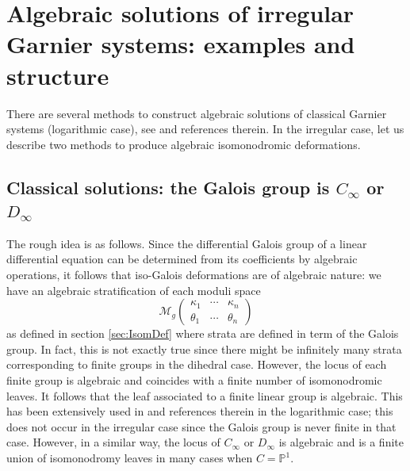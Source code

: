 \documentclass[12]{amsart}
\begin{document}
\section{Algebraic solutions of irregular Garnier systems: examples and structure}\label{sec:algsol}

There are several methods to construct algebraic solutions of classical Garnier systems (logarithmic case),
see \cite{AK,Boalch,CM,Diarra1,Doran,DM0,LisovyyTykhyy} and references therein.
In the irregular case, let us describe two methods to produce algebraic isomonodromic deformations.




\subsection{Classical solutions: the Galois group is $C_\infty$ or $D_\infty$}\label{sec:classicalsol}
The rough idea is as follows. Since the differential Galois group of a linear differential equation can be determined
from its coefficients by algebraic operations, it follows that iso-Galois deformations are of algebraic nature:
we have an algebraic stratification of each moduli space 
$$\mathcal M_g\begin{pmatrix}\kappa_1&\cdots&\kappa_n\\
\theta_1&\cdots&\theta_n\end{pmatrix}$$  
as  defined in section \ref{sec:IsomDef} where strata are defined in term of the Galois group. In fact, 
this is not exactly true since there might be infinitely many strata corresponding to finite groups in the dihedral case.
However, the locus of each finite group is algebraic and coincides with a finite number of isomonodromic leaves.
It follows that the leaf associated to a finite linear group is algebraic. This has been extensively used in \cite{Hitchin,BoalchIco,BoalchTetraOcta,Boalch6,BoalchHigherGenus,Boalch}
and references therein in the logarithmic case; this does not occur in the irregular case since the Galois group is never finite
in that case. 
However, in a similar way, the locus of $C_\infty$ or $D_\infty$ is algebraic and is a finite union of isomonodromy leaves
in many cases when $C=\mathbb P^1$.
\end{document}
